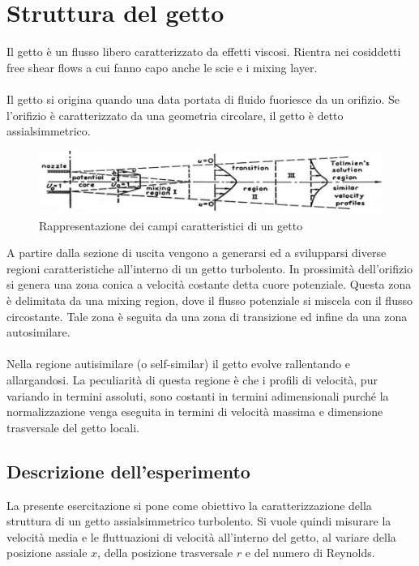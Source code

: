 \section{Struttura del getto}
Il getto è un flusso libero caratterizzato da effetti viscosi. Rientra nei cosiddetti free shear flows a cui fanno capo anche le scie e i mixing layer.\\\\
Il getto si origina quando una data portata di fluido fuoriesce da un orifizio. Se l'orifizio è caratterizzato da una geometria circolare, il getto è detto assialsimmetrico.
\begin{figure}[h]
    \centering
    \includegraphics[width=0.95\linewidth]{images/3/getto.png}
    \caption{Rappresentazione dei campi caratteristici di un getto}
\end{figure}

\noindent A partire dalla sezione di uscita vengono a generarsi ed a svilupparsi diverse regioni caratteristiche all'interno di un getto turbolento. In prossimità dell'orifizio si genera una zona conica a velocità costante detta cuore potenziale. Questa zona è delimitata da una mixing region, dove il flusso potenziale si miscela con il flusso circostante. Tale zona è seguita da una zona di transizione ed infine da una zona autosimilare.\\\\
Nella regione autisimilare (o self-similar) il getto evolve rallentando e allargandosi. La peculiarità di questa regione è che i profili di velocità, pur variando in termini assoluti, sono costanti in termini adimensionali purché la normalizzazione venga eseguita in termini di velocità massima e dimensione trasversale del getto locali.

\subsection{Descrizione dell'esperimento}
La presente esercitazione si pone come obiettivo la caratterizzazione della struttura di un getto assialsimmetrico turbolento. Si vuole quindi misurare la velocità media e le fluttuazioni di velocità all'interno del getto, al variare della posizione assiale $x$, della posizione trasversale $r$ e del numero di Reynolds.

